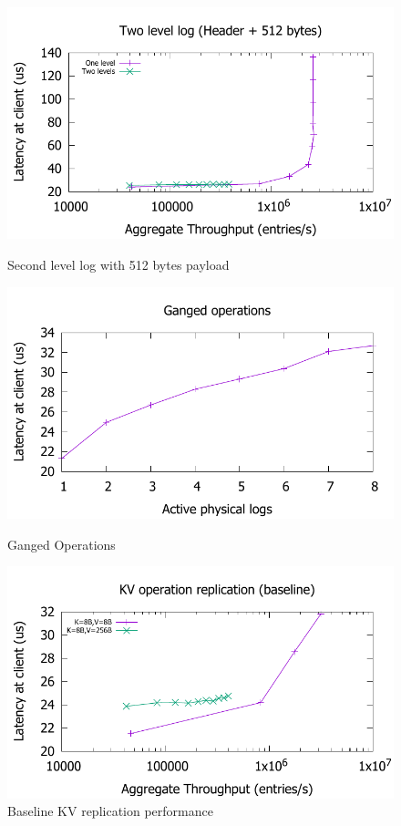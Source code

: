 \documentclass[pageno]{jpaper}
\begin{document}
\begin{figure}
\begin{minipage}{0.33\textwidth}
  \includegraphics[scale=0.45]{results2/flashlog_512.pdf}
  \caption{Second level log with 512 bytes payload}
  \label{fig:flashlog_512}
\end{minipage}
\begin{minipage}{0.33\textwidth}
  \includegraphics[scale=0.45]{results2/multi.pdf}
  \caption{Ganged Operations}
  \label{fig:ganged}
\end{minipage}
\begin{minipage}{0.33\textwidth}
  \includegraphics[scale=0.45]{results2/kv_baseline.pdf}
  \caption{Baseline KV replication performance}
  \label{fig:kv_baseline}
\end{minipage}
\end{figure}
\end{document}
